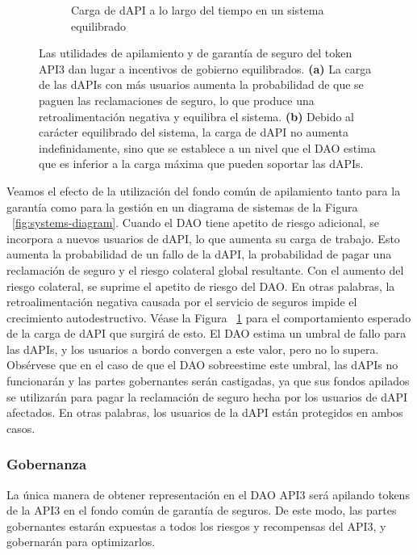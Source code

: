 \documentclass[11pt]{article}
\begin{document}
\begin{figure}
\begin{subfigure}{0.49\textwidth}
         \caption{Carga de dAPI a lo largo del tiempo en un sistema equilibrado}
         \label{fig:systems-diagram-plot}
     \end{subfigure}
    \caption{Las utilidades de apilamiento y de garantía de seguro del token API3 dan lugar a incentivos de gobierno equilibrados. 
    \textbf{(a)} La carga de las dAPIs con más usuarios aumenta la probabilidad de que se paguen las reclamaciones de seguro, lo que produce una retroalimentación negativa y equilibra el sistema.
   \textbf{(b)} Debido al carácter equilibrado del sistema, la carga de dAPI no aumenta indefinidamente, sino que se establece a un nivel que el DAO estima que es inferior a la carga máxima que pueden soportar las dAPIs.}
    \label{fig:systems-diagram-full}
\end{figure}

Veamos el efecto de la utilización del fondo común de apilamiento tanto para la garantía como para la gestión en un diagrama de sistemas de la Figura ~\ref{fig:systems-diagram}.
Cuando el DAO tiene apetito de riesgo adicional, se incorpora a nuevos usuarios de dAPI, lo que aumenta su carga de trabajo. Esto aumenta la probabilidad de un fallo de la dAPI, la probabilidad de pagar una reclamación de seguro y el riesgo colateral global resultante.  Con el aumento del riesgo colateral, se suprime el apetito de riesgo del DAO. En otras palabras, la retroalimentación negativa causada por el servicio de seguros impide el crecimiento autodestructivo. Véase la Figura ~\ref{fig:systems-diagram-plot} para el comportamiento esperado de la carga de dAPI que surgirá de esto. El DAO estima un umbral de fallo para las dAPIs, y los usuarios a bordo convergen a este valor, pero no lo supera. Obsérvese que en el caso de que el DAO sobreestime este umbral, las dAPIs no funcionarán y las partes gobernantes serán castigadas, ya que sus fondos apilados se utilizarán para pagar la reclamación de seguro hecha por los usuarios de dAPI afectados. En otras palabras, los usuarios de la dAPI están protegidos en ambos casos.

\subsubsection{Gobernanza}
\label{sec:governance}

La única manera de obtener representación en el DAO API3 será apilando tokens de la API3 en el fondo común de garantía de seguros. De este modo, las partes gobernantes estarán expuestas a todos los riesgos y recompensas del API3, y gobernarán para optimizarlos.
\end{document}

